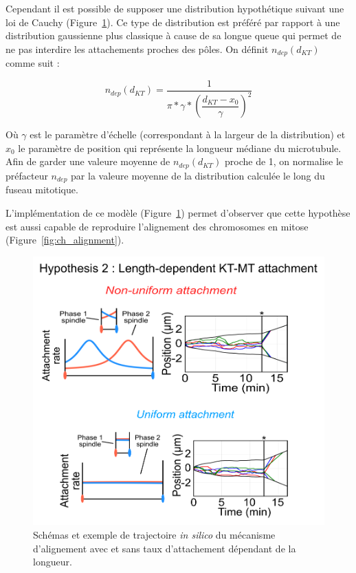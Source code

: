\documentclass[12pt,a4paper,twoside,openright]{book}
\begin{document}
Cependant il est possible de supposer une distribution hypothétique
suivant une loi de Cauchy (Figure~\ref{fig:hyp2}). Ce type de
distribution est préféré par rapport à une distribution gaussienne plus
classique à cause de sa longue queue qui permet de ne pas interdire les
attachements proches des pôles. On définit \(n_{dep}(d_{KT})\) comme
suit :

\[
n_{dep}(d_{KT}) = \dfrac{1}{\pi * \gamma * (\dfrac{d_{KT} - x_0}{\gamma})^2}
\]

Où \(\gamma\) est le paramètre d'échelle (correspondant à la largeur de
la distribution) et \(x_0\) le paramètre de position qui représente la
longueur médiane du microtubule. Afin de garder une valeure moyenne de
\(n_{dep}(d_{KT})\) proche de 1, on normalise le préfacteur \(n_{dep}\)
par la valeure moyenne de la distribution calculée le long du fuseau
mitotique.

L'implémentation de ce modèle (Figure~\ref{fig:hyp2}) permet d'observer
que cette hypothèse est aussi capable de reproduire l'alignement des
chromosomes en mitose (Figure~\ref{fig:ch_alignment}).

\begin{figure}[htbp]
\centering
\includegraphics{figures/results/modelling/hyp2.png}
\caption[Second mécanisme expliquant l'alignement des chromosomes]{\label{fig:hyp2}Schémas
et exemple de trajectoire \emph{in silico} du mécanisme d'alignement
avec et sans taux d'attachement dépendant de la longueur.}
\end{figure}
\end{document}
